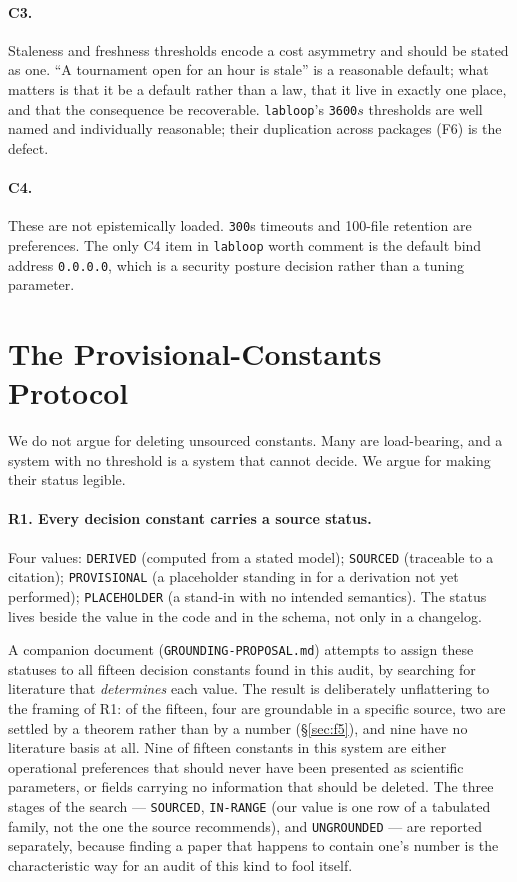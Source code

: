 \documentclass[10pt,twocolumn,letterpaper]{article}
\newcommand{\code}[1]{\texttt{#1}}
\begin{document}
\paragraph{C3.} Staleness and freshness thresholds encode a cost asymmetry and should be stated as
one. ``A tournament open for an hour is stale'' is a reasonable default; what matters is that it
be a default rather than a law, that it live in exactly one place, and that the consequence be
recoverable. \code{labloop}'s \code{3600}$s$ thresholds are well named and individually
reasonable; their duplication across packages (F6) is the defect.

\paragraph{C4.} These are not epistemically loaded. \code{300}s timeouts and 100-file retention
are preferences. The only C4 item in \code{labloop} worth comment is the default bind address
\code{0.0.0.0}, which is a security posture decision rather than a tuning parameter.

\section{The Provisional-Constants Protocol}
\label{sec:protocol}

We do not argue for deleting unsourced constants. Many are load-bearing, and a system with no
threshold is a system that cannot decide. We argue for making their status legible.

\paragraph{R1. Every decision constant carries a source status.} Four values:
\code{DERIVED} (computed from a stated model); \code{SOURCED} (traceable to a citation);
\code{PROVISIONAL} (a placeholder standing in for a derivation not yet performed);
\code{PLACEHOLDER} (a stand-in with no intended semantics). The status lives beside the value in
the code and in the schema, not only in a changelog.

A companion document (\code{GROUNDING-PROPOSAL.md}) attempts to assign these statuses to all
fifteen decision constants found in this audit, by searching for literature that \emph{determines}
each value. The result is deliberately unflattering to the framing of R1: of the fifteen, four are
groundable in a specific source, two are settled by a theorem rather than by a number
(\S\ref{sec:f5}), and nine have no literature basis at all. Nine of fifteen constants in this
system are either operational preferences that should never have been presented as scientific
parameters, or fields carrying no information that should be deleted. The three stages of the
search --- \code{SOURCED}, \code{IN-RANGE} (our value is one row of a tabulated family, not the
one the source recommends), and \code{UNGROUNDED} --- are reported separately, because finding a
paper that happens to contain one's number is the characteristic way for an audit of this kind to
fool itself.
\end{document}
